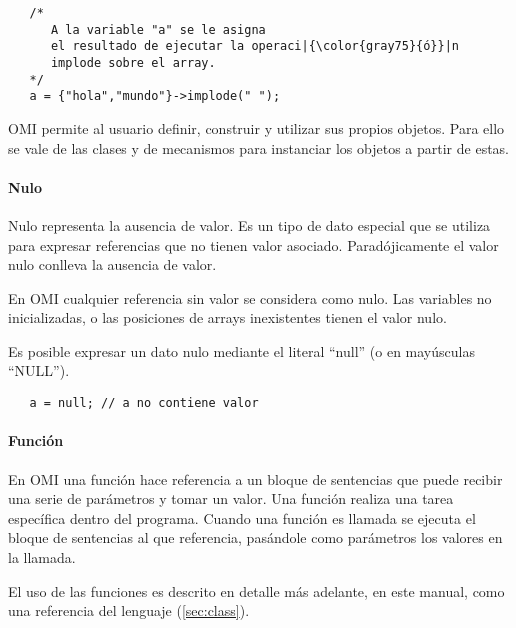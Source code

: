 \begin{lstlisting}
   /*
      A la variable "a" se le asigna
      el resultado de ejecutar la operaci|{\color{gray75}{ó}}|n 
      implode sobre el array. 
   */
   a = {"hola","mundo"}->implode(" ");
\end{lstlisting} 

OMI permite al usuario definir, construir y utilizar sus propios objetos. Para ello se vale de las clases
y de mecanismos para instanciar los objetos a partir de estas.


\paragraph{Nulo}
Nulo representa la ausencia de valor. Es un tipo de dato especial que se utiliza para expresar referencias que no tienen valor asociado. Paradójicamente el
valor nulo conlleva la ausencia de valor. 

En OMI cualquier referencia sin valor se considera como nulo. Las variables no inicializadas, o las posiciones de arrays inexistentes tienen el valor nulo. 

Es posible expresar un dato nulo mediante el literal ``null'' (o en mayúsculas ``NULL''). \\

\begin{lstlisting}
   a = null; // a no contiene valor
\end{lstlisting} 

\paragraph{Función}\label{sec:type_func}
En OMI una función hace referencia a un bloque de sentencias que puede recibir una serie de parámetros y tomar un valor. Una función realiza una tarea específica dentro del programa.
Cuando una función es llamada se ejecuta el bloque de sentencias al que referencia, pasándole como parámetros los valores en la llamada. 

El uso de las funciones es descrito en detalle más adelante, en este manual, como una referencia del lenguaje (\autoref{sec:class}). 

